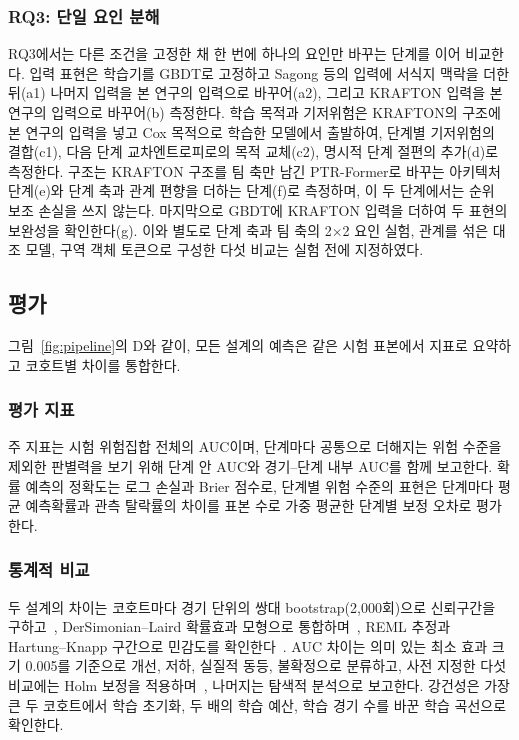 \subsubsection{RQ3: 단일 요인 분해}
\label{sec:method:decomposition}
RQ3에서는 다른 조건을 고정한 채 한 번에 하나의 요인만 바꾸는 단계를 이어 비교한다.
입력 표현은 학습기를 GBDT로 고정하고 Sagong 등의 입력에 서식지 맥락을 더한 뒤(a1) 나머지 입력을 본 연구의 입력으로 바꾸어(a2), 그리고 KRAFTON 입력을 본 연구의 입력으로 바꾸어(b) 측정한다.
학습 목적과 기저위험은 KRAFTON의 구조에 본 연구의 입력을 넣고 Cox 목적으로 학습한 모델에서 출발하여, 단계별 기저위험의 결합(c1), 다음 단계 교차엔트로피로의 목적 교체(c2), 명시적 단계 절편의 추가(d)로 측정한다.
구조는 KRAFTON 구조를 팀 축만 남긴 PTR-Former로 바꾸는 아키텍처 단계(e)와 단계 축과 관계 편향을 더하는 단계(f)로 측정하며, 이 두 단계에서는 순위 보조 손실을 쓰지 않는다.
마지막으로 GBDT에 KRAFTON 입력을 더하여 두 표현의 보완성을 확인한다(g).
이와 별도로 단계 축과 팀 축의 2$\times$2 요인 실험, 관계를 섞은 대조 모델, 구역 객체 토큰으로 구성한 다섯 비교는 실험 전에 지정하였다.

\subsection{평가}
\label{sec:method:evaluation}
그림~\ref{fig:pipeline}의 D와 같이, 모든 설계의 예측은 같은 시험 표본에서 지표로 요약하고 코호트별 차이를 통합한다.

\subsubsection{평가 지표}
주 지표는 시험 위험집합 전체의 AUC이며, 단계마다 공통으로 더해지는 위험 수준을 제외한 판별력을 보기 위해 단계 안 AUC와 경기--단계 내부 AUC를 함께 보고한다.
확률 예측의 정확도는 로그 손실과 Brier 점수로, 단계별 위험 수준의 표현은 단계마다 평균 예측확률과 관측 탈락률의 차이를 표본 수로 가중 평균한 단계별 보정 오차로 평가한다.

\subsubsection{통계적 비교}
두 설계의 차이는 코호트마다 경기 단위의 쌍대 bootstrap(2,000회)으로 신뢰구간을 구하고~\cite{Efron93}, DerSimonian--Laird 확률효과 모형으로 통합하며~\cite{DerSimonian86}, REML 추정과 Hartung--Knapp 구간으로 민감도를 확인한다~\cite{Viechtbauer05,HartungKnapp01}.
AUC 차이는 의미 있는 최소 효과 크기 0.005를 기준으로 개선, 저하, 실질적 동등, 불확정으로 분류하고, 사전 지정한 다섯 비교에는 Holm 보정을 적용하며~\cite{Holm79}, 나머지는 탐색적 분석으로 보고한다.
강건성은 가장 큰 두 코호트에서 학습 초기화, 두 배의 학습 예산, 학습 경기 수를 바꾼 학습 곡선으로 확인한다.
